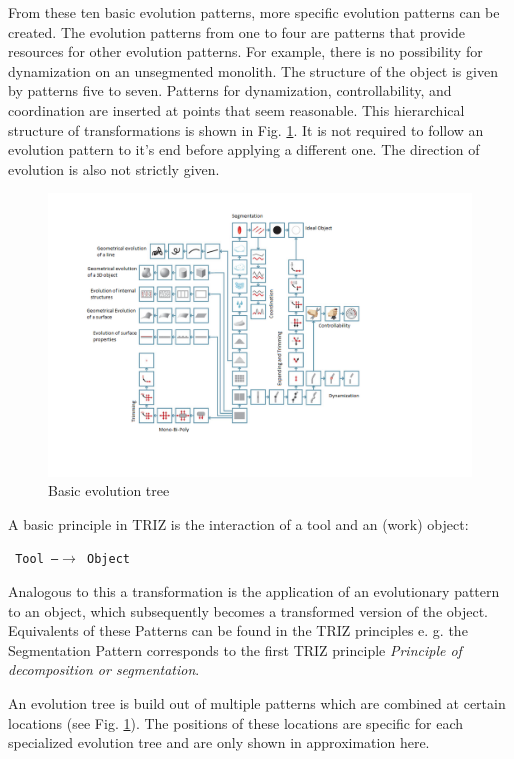 \documentclass[11pt,a4paper]{article}
\begin{document}
From these ten basic evolution patterns, more specific evolution patterns can
be created. The evolution patterns from one to four are patterns that provide
resources for other evolution patterns. For example, there is no possibility
for dynamization on an unsegmented monolith. The structure of the object is
given by patterns five to seven. Patterns for dynamization, controllability,
and coordination are inserted at points that seem reasonable. This
hierarchical structure of transformations is shown in
Fig. \ref{fig:basic_evo}.  It is not required to follow an evolution pattern
to it's end before applying a different one. The direction of evolution is
also not strictly given.

\begin{figure}[htb]
  \centering
  \includegraphics[width=\textwidth]{figures/basictree.png}
  \caption{\small Basic evolution tree \cite{Shpakovsky2016}}
  \label{fig:basic_evo}
\end{figure}

A basic principle in TRIZ is the interaction of a tool and an (work) object:

\begin{center}\tt
  Tool \textrm{---}$\to$ Object
\end{center}

Analogous to this a transformation is the application of an evolutionary
pattern to an object, which subsequently becomes a transformed version of the
object. Equivalents of these Patterns can be found in the TRIZ principles
e. g. the Segmentation Pattern corresponds to the first TRIZ principle
\textit{Principle of decomposition or segmentation}.

An evolution tree is build out of multiple patterns which are combined at
certain locations (see Fig. \ref{fig:basic_evo}). The positions of these
locations are specific for each specialized evolution tree and are only shown
in approximation here.
\end{document}
